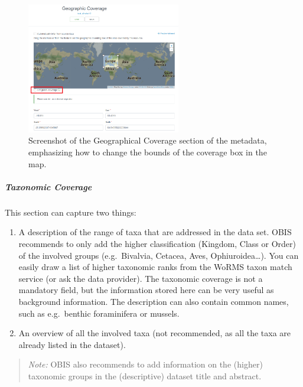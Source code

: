 \documentclass[
  letterpaper,
  DIV=11,
  numbers=noendperiod,
  oneside]{scrreprt}
\let\oldsubparagraph\subparagraph
\renewcommand{\subparagraph}[1]{\oldsubparagraph{#1}\mbox{}}
\providecommand{\tightlist}{%
  \setlength{\itemsep}{0pt}\setlength{\parskip}{0pt}}\usepackage{longtable,booktabs,array}
\begin{document}
\begin{figure}

{\centering \includegraphics[width=0.6\textwidth,height=\textheight]{images/ipt-ss13-meta-geo.png}

}

\caption{Screenshot of the Geographical Coverage section of the
metadata, emphasizing how to change the bounds of the coverage box in
the map.}

\end{figure}

\hypertarget{taxonomic-coverage}{%
\subparagraph{Taxonomic Coverage}\label{taxonomic-coverage}}

This section can capture two things:

\begin{enumerate}
\def\labelenumi{\arabic{enumi}.}
\tightlist
\item
  A description of the range of taxa that are addressed in the data set.
  OBIS recommends to only add the higher classification (Kingdom, Class
  or Order) of the involved groups (e.g.~Bivalvia, Cetacea, Aves,
  Ophiuroidea\ldots). You can easily draw a list of higher taxonomic
  ranks from the WoRMS taxon match service (or ask the data provider).
  The taxonomic coverage is not a mandatory field, but the information
  stored here can be very useful as background information. The
  description can also contain common names, such as e.g.~benthic
  foraminifera or mussels.
\item
  An overview of all the involved taxa (not recommended, as all the taxa
  are already listed in the dataset).
\end{enumerate}

\begin{quote}
\emph{Note:} OBIS also recommends to add information on the (higher)
taxonomic groups in the (descriptive) dataset title and abstract.
\end{quote}
\end{document}
